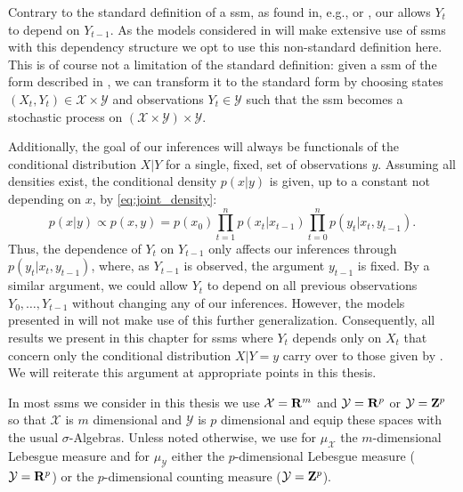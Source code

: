 \begin{remark}
    \label{rem:dependence_Yt-1}
    Contrary to the standard definition of a \gls{ssm}, as found in, e.g., \citep[Chapter 2]{Chopin2020Introduction} or \citep[Chapter 9]{Durbin2012Time}, our   allows $Y_t$ to depend on $Y_{t - 1}$.
    As the models considered in  will make extensive use of \glspl{ssm} with this dependency structure we opt to use this non-standard definition here.
    This is of course not a limitation of the standard definition: given a \gls{ssm} of the form described in , we can transform it to the standard form by choosing states $(X_t, Y_t) \in \mathcal X \times \mathcal Y$ and observations $Y_t \in \mathcal Y$ such that the \gls{ssm} becomes a stochastic process on $ \left( \mathcal X \times \mathcal Y\right) \times \mathcal Y$.

    Additionally, the goal of our inferences will always be functionals of the conditional distribution $X|Y$ for a single, fixed, set of observations $y$. Assuming all densities exist, the conditional density $p(x|y)$ is given, up to a constant not depending on $x$, by \eqref{eq:joint_density}:
    $$
    p(x|y) \propto p(x,y) =p (x_0)\prod_{t = 1}^{n} p(x_{t}|x_{t - 1}) \prod_{t = 0}^{n} p(y_t | x_t, y_{t - 1}).
    $$
    Thus, the dependence of $Y_{t}$ on $Y_{t - 1}$ only affects our inferences through $p(y_{t} | x_{t}, y_{t - 1})$, where, as $Y_{t - 1}$ is observed, the argument $y_{t - 1}$ is fixed. By a similar argument, we could allow $Y_{t}$ to depend on all previous observations $Y_{0}, \dots, Y_{t - 1}$ without changing any of our inferences. However, the models presented in  will not make use of this further generalization.
    Consequently, all results we present in this chapter for \glspl{ssm} where $Y_{t}$ depends only on $X_{t}$ that concern only the conditional distribution $X|Y=y$ carry over to those given by . We will reiterate this argument at appropriate points in this thesis.

    In most \glspl{ssm} we consider in this thesis we use $\mathcal X = \mathbf R^m$ and $\mathcal Y = \mathbf R^p$ or $\mathcal Y = \mathbf Z^p$ so that $\mathcal X$ is $m$ dimensional and $\mathcal Y$ is $p$ dimensional and equip these spaces with the usual $\sigma$-Algebras. Unless noted otherwise, we use for $\mu_{\mathcal X}$ the $m$-dimensional Lebesgue measure and for $\mu_{\mathcal Y}$ either the $p$-dimensional Lebesgue measure ($\mathcal Y = \mathbf R^{p}$) or the $p$-dimensional counting measure ($\mathcal Y = \mathbf Z^{p}$).
    
\end{remark}

